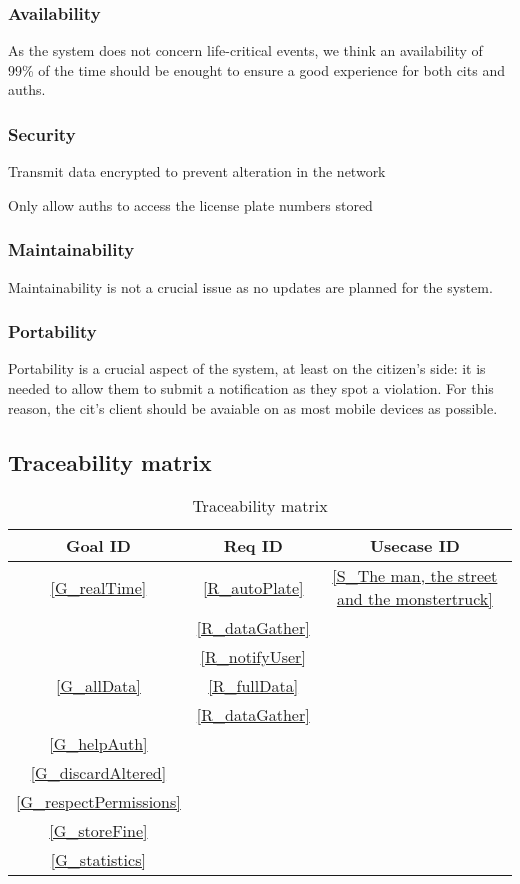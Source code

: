 \documentclass{article}
\begin{document}
		\subsubsection{Availability}
			As the system does not concern life-critical events, we think an availability of 99\% of the time should be enought to ensure a good experience for both cits and auths.
			
		\subsubsection{Security}
			\begin{list}{-}{}
				\item Transmit data encrypted to prevent alteration in the network
				\item Only allow auths to access the license plate numbers stored
			\end{list}
			
		\subsubsection{Maintainability}
			Maintainability is not a crucial issue as no updates are planned for the system.
			
		\subsubsection{Portability}
			Portability is a crucial aspect of the system, at least on the citizen's side: it is needed to allow them to submit a notification as they spot a violation. For this reason, the cit's client should be avaiable on as most mobile devices as possible.
			
	\subsection{Traceability matrix}
		\begin{table}[h]
			\begin{center}
				\caption{Traceability matrix}
				\label{Trace matrix}
				\begin{tabular}{S|S|S}
					\textbf{Goal ID} & \textbf{Req ID} & \textbf{Usecase ID}\\
					\hline
					\ref{G_realTime} & \ref{R_autoPlate} & \ref{S_The man, the street and the monstertruck}\\
					&\ref{R_dataGather}&\\
					&\ref{R_notifyUser}&\\
					\hline
					\ref{G_allData} & \ref{R_fullData} & \\
						& \ref{R_dataGather} & \\
					\hline
					\ref{G_helpAuth}&&\\
					\hline
					\ref{G_discardAltered}&&\\
					\hline
					\ref{G_respectPermissions}&&\\
					\hline
					\ref{G_storeFine}&&\\
					\hline
					\ref{G_statistics}&&\\
				\end{tabular}
			\end{center}
		\end{table}
		
\end{document}
